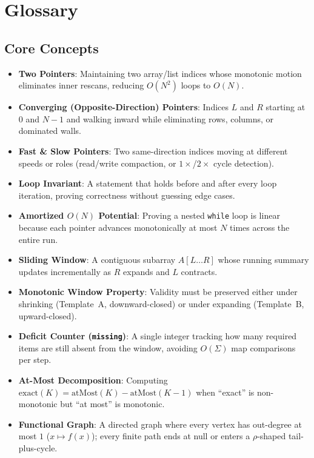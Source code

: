 \documentclass[11pt,a4paper]{article}
\theoremstyle{definition}
\begin{document}

\section{Glossary}

\subsection*{Core Concepts}
\begin{itemize}[itemsep=2pt]
    \item \textbf{Two Pointers}: Maintaining two array/list indices whose monotonic motion eliminates inner rescans, reducing $O(N^2)$ loops to $O(N)$.
    \item \textbf{Converging (Opposite-Direction) Pointers}: Indices $L$ and $R$ starting at $0$ and $N-1$ and walking inward while eliminating rows, columns, or dominated walls.
    \item \textbf{Fast \& Slow Pointers}: Two same-direction indices moving at different speeds or roles (read/write compaction, or $1\times$/$2\times$ cycle detection).
    \item \textbf{Loop Invariant}: A statement that holds before and after every loop iteration, proving correctness without guessing edge cases.
    \item \textbf{Amortized $O(N)$ Potential}: Proving a nested \texttt{while} loop is linear because each pointer advances monotonically at most $N$ times across the entire run.
    \item \textbf{Sliding Window}: A contiguous subarray $A[L \dots R]$ whose running summary updates incrementally as $R$ expands and $L$ contracts.
    \item \textbf{Monotonic Window Property}: Validity must be preserved either under shrinking (Template~A, downward-closed) or under expanding (Template~B, upward-closed).
    \item \textbf{Deficit Counter (\texttt{missing})}: A single integer tracking how many required items are still absent from the window, avoiding $O(\Sigma)$ map comparisons per step.
    \item \textbf{At-Most Decomposition}: Computing $\text{exact}(K) = \text{atMost}(K) - \text{atMost}(K - 1)$ when ``exact'' is non-monotonic but ``at most'' is monotonic.
    \item \textbf{Functional Graph}: A directed graph where every vertex has out-degree at most $1$ ($x \mapsto f(x)$); every finite path ends at null or enters a $\rho$-shaped tail-plus-cycle.
\end{itemize}
\end{document}

